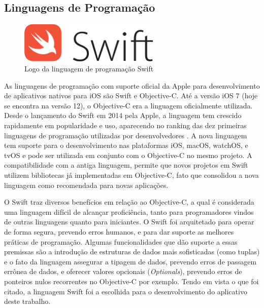 \subsection{Linguagens de Programação}
\begin{figure}[h]
    \centering
    \includegraphics[width=0.6\textwidth]{pfc/figuras/swift.png}
    \caption{Logo da linguagem de programação Swift}
    \label{fig:swift}
\end{figure}
As linguagens de programação com suporte oficial da Apple para desenvolvimento de aplicativos nativos para iOS são Swift e Objective-C. Até a versão iOS 7 (hoje se encontra na versão 12), o Objective-C era a linguagem oficialmente utilizada. Desde o lançamento do Swift em 2014 pela Apple, a linguagem tem crescido rapidamente em popularidade e uso, aparecendo no ranking das dez primeiras linguagens de programação utilizadas por desenvolvedores \cite{redmonk}. A nova linguagem tem suporte para o desenvolvimento nas plataformas iOS, macOS, watchOS, e tvOS e pode ser utilizada em conjunto com o Objective-C no mesmo projeto. A compatibilidade com a antiga linguagem, permite que novos projetos em Swift utilizem bibliotecas já implementadas em Objective-C, fato que consolidou a nova linguagem como recomendada para novas aplicações.

O Swift traz diversos benefícios em relação ao Objective-C, a qual é considerada uma linguagem difícil de alcançar proficiência, tanto para programadores vindos de outras linguagens quanto para iniciantes. O Swift foi arquitetado para operar de forma segura, prevendo erros humanos, e para dar suporte as melhores práticas de programação. Algumas funcionalidades que dão suporte a essas premissas são a introdução de estruturas de dados mais sofisticadas (como tuplas) e o fato da linguagem assegurar a tipagem de dados, prevendo erros de passagem errônea de dados, e oferecer valores opcionais (\textit{Optionals}), prevendo erros de ponteiros nulos recorrentes no Objective-C por exemplo. Tendo em vista o que foi citado, a linguagem Swift foi a escolhida para o desenvolvimento do aplicativo deste trabalho.


